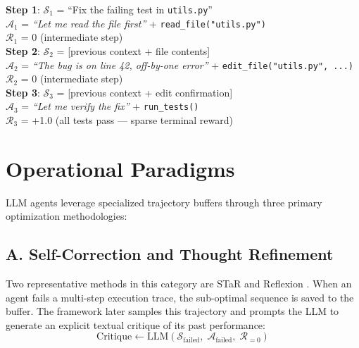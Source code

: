 \begin{examplebox}
\textbf{Step 1}: $\mathcal{S}_1$ = ``Fix the failing test in \texttt{utils.py}''\\

$\mathcal{A}_1$ = \emph{``Let me read the file first''} + \texttt{read\_file("utils.py")}\\

$\mathcal{R}_1$ = 0 (intermediate step)\\

\textbf{Step 2}: $\mathcal{S}_2$ = [previous context + file contents]\\

$\mathcal{A}_2$ = \emph{``The bug is on line 42, off-by-one error''} + \texttt{edit\_file("utils.py", ...)}\\

$\mathcal{R}_2$ = 0 (intermediate step)\\

\textbf{Step 3}: $\mathcal{S}_3$ = [previous context + edit confirmation]\\

$\mathcal{A}_3$ = \emph{``Let me verify the fix''} + \texttt{run\_tests()}\\

$\mathcal{R}_3$ = +1.0 (all tests pass --- sparse terminal reward)
\end{examplebox}

\section{Operational Paradigms}
\label{operational-paradigms}

LLM agents leverage specialized trajectory buffers through three primary optimization methodologies:

\subsection{A. Self-Correction and Thought Refinement}
\label{a.-self-correction-and-thought-refinement-star-reflexion}

Two representative methods in this category are STaR \cite{zelikman2022star} and Reflexion \cite{shinn2023reflexion}. When an agent fails a multi-step execution trace, the sub-optimal sequence is saved to the buffer. The framework later samples this trajectory and prompts the LLM to generate an explicit textual critique of its past performance: 
\begin{equation}
\text{Critique} \leftarrow \text{LLM}(\mathcal{S}_{\text{failed}},\; \mathcal{A}_{\text{failed}},\; \mathcal{R}_{=0})
\end{equation}

